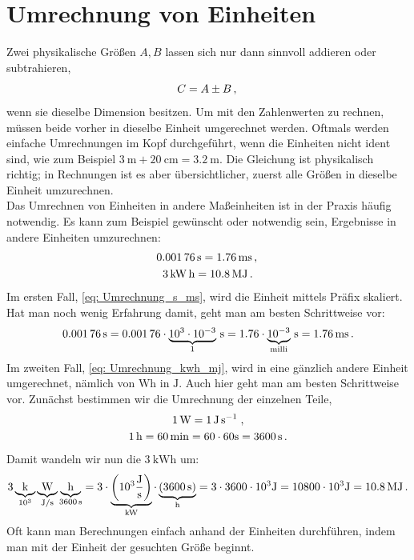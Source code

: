 \section{Umrechnung von Einheiten}\label{sec: Umrechnung_Einheiten}
Zwei physikalische Größen $A, B$ lassen sich nur dann sinnvoll addieren oder subtrahieren,  
\begin{equation}
    C = A \pm B \,{,}\,
\end{equation}
wenn sie dieselbe Dimension besitzen. Um mit den Zahlenwerten zu rechnen, müssen beide vorher in dieselbe Einheit umgerechnet werden.
Oftmals werden einfache Umrechnungen im Kopf durchgeführt, wenn die Einheiten nicht ident sind, wie zum Beispiel $\SI{3}{\meter} + \SI{20}{\centi\meter} = \SI{3.2}{\meter}$. Die Gleichung ist physikalisch richtig; in Rechnungen ist es aber übersichtlicher, zuerst alle Größen in dieselbe Einheit umzurechnen. \\

Das Umrechnen von Einheiten in andere Maßeinheiten ist in der Praxis häufig notwendig. Es kann zum Beispiel gewünscht oder notwendig sein, Ergebnisse in andere Einheiten umzurechnen:
\begin{gather}
    \SI{0.00176}{\second} = \SI{1.76}{\milli\second} \,{,}\, \label{eq: Umrechnung_s_ms}\\
    \SI{3}{\kilo\watt\hour} = \SI{10.8}{\mega\joule} \,. \label{eq: Umrechnung_kwh_mj}    
\end{gather}
Im ersten Fall, \cref{eq: Umrechnung_s_ms}, wird die Einheit mittels Präfix skaliert. Hat man noch wenig Erfahrung damit, geht man am besten Schrittweise vor:  
\begin{equation}
    \SI{0.00176}{\second} = \num{0.00176}\cdot \underbrace{10^3\cdot 10^{-3}}_{1} \,\si{\second} = \num{1.76} \cdot \underbrace{10^{-3}}_{\textrm{milli}} \,\si{\second} =\SI{1.76}{\milli\second}\,.
\end{equation}
Im zweiten Fall, \cref{eq: Umrechnung_kwh_mj}, wird in eine gänzlich andere Einheit umgerechnet, nämlich von $\textrm{Wh}$ in $\si{\joule}$. Auch hier geht man am besten Schrittweise vor. Zunächst bestimmen wir die Umrechnung der einzelnen Teile, 
\begin{gather*}
    \SI{1}{\watt} = \SI{1}{\joule\per\second}\; , \\
    \SI{1}{\hour} = \SI{60}{\minute} = 60\cdot 60 \si{\second} = \SI{3600}{\second}\,.\\
\end{gather*}
Damit wandeln wir nun die $\SI{3}{\kilo\watt\hour}$ um:
\begin{equation}
    3 \underbrace{\textrm{k}}_{10^3} \underbrace{\textrm{W}}_{\si{\joule/\second}} \underbrace{\textrm{h}}_{\SI{3600}{\second}} = 3\cdot \underbrace{\left(10^3 \frac{\si{\joule}}{\si{\second}} \right)}_{\si{\kilo\watt}} \cdot \underbrace{(\SI{3600}{\second})}_{\si{\hour}} = 3\cdot 3600\cdot 10^3 \si{\joule} = 10800 \cdot 10^3 \si{\joule} = \SI{10.8}{\mega\joule}\,.
\end{equation}
Oft kann man Berechnungen einfach anhand der Einheiten durchführen, indem man mit der Einheit der gesuchten Größe beginnt. 

